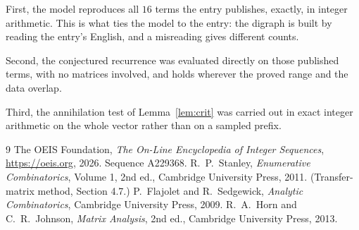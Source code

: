 \documentclass[11pt,a4paper]{article}
\theoremstyle{plain}
\theoremstyle{definition}
\begin{document}
First, the model reproduces all $16$ terms the entry publishes, exactly, in integer
arithmetic. This is what ties the model to the entry: the digraph is built by reading the
entry's English, and a misreading gives different counts.

Second, the conjectured recurrence was evaluated directly on those published terms, with no
matrices involved, and holds wherever the proved range and the data overlap.

Third, the annihilation test of Lemma~\ref{lem:crit} was carried out in exact integer
arithmetic on the whole vector rather than on a sampled prefix.

\begin{thebibliography}{9}
 The OEIS Foundation, \emph{The On-Line Encyclopedia of Integer
Sequences}, \url{https://oeis.org}, 2026. Sequence A229368.
 R.~P.~Stanley, \emph{Enumerative Combinatorics}, Volume 1, 2nd ed.,
Cambridge University Press, 2011. (Transfer-matrix method, Section 4.7.)
 P.~Flajolet and R.~Sedgewick, \emph{Analytic Combinatorics}, Cambridge
University Press, 2009.
 R.~A.~Horn and C.~R.~Johnson, \emph{Matrix Analysis}, 2nd ed., Cambridge
University Press, 2013.
\end{thebibliography}
\end{document}
